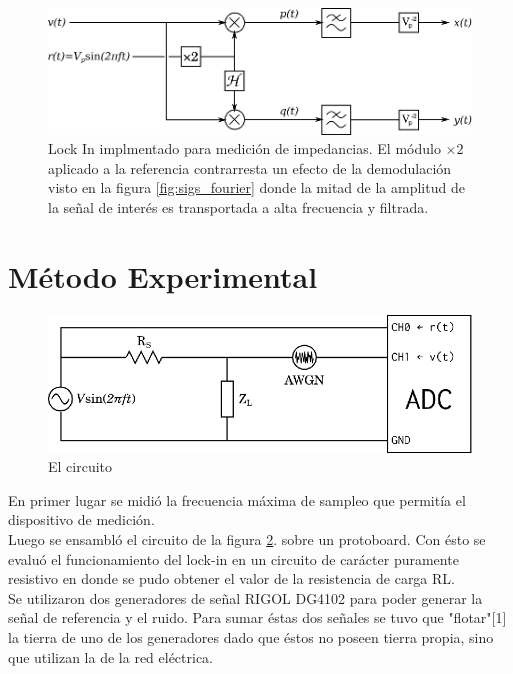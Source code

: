 \documentclass[11pt,a4paper]{extarticle}
\begin{document}
\begin{multicols}{2}
\begin{figure}[H]
	\centering
	\includegraphics[width=\linewidth]{Images/nuestro_lockin.eps}
	\caption{Lock In implmentado para medición de impedancias. El módulo $\times 2$ aplicado a la referencia contrarresta un efecto de la demodulación visto en la figura \ref{fig:sigs_fourier} donde la mitad de la amplitud de la señal de interés es transportada a alta frecuencia y filtrada.}
	\label{fig:nuestro_lockin}
\end{figure}

\section{Método Experimental}
\begin{figure}[H]
	\centering
	\includegraphics[width=\linewidth]{Images/circuito.eps}
	\caption{El circuito}
	\label{fig:circuito}
\end{figure}

En primer lugar se midió la frecuencia máxima de 
sampleo que permitía el dispositivo de medición.\\

Luego se ensambló el circuito de la figura \ref{fig:circuito}. sobre 
un protoboard. Con ésto se evaluó el funcionamiento del
lock-in en un circuito de carácter puramente resistivo 
en donde se pudo obtener el valor de la resistencia 
de carga RL.\\ 

Se utilizaron dos generadores de señal RIGOL DG4102 
para poder generar la señal de referencia y el ruido.
Para sumar éstas dos señales se tuvo que "flotar"[1] la 
tierra de uno de los generadores dado que éstos no poseen 
tierra propia, sino que utilizan la de la red eléctrica.\\


\end{multicols}
\end{document}

